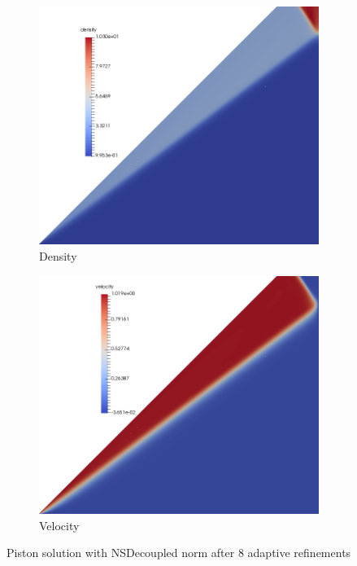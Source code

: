 \documentclass[Dissertation.tex]{subfiles}
\begin{document}
\begin{figure}[ht]
\centering
\begin{subfigure}[t]{0.7\textwidth}
\centering
\includegraphics[width=\textwidth]{Piston/Piston_density.png}
\caption{Density}
\end{subfigure}
\begin{subfigure}[t]{0.7\textwidth}
\centering
\includegraphics[width=\textwidth]{Piston/Piston_velocity.png}
\caption{Velocity}
\end{subfigure}
\caption{Piston solution with NSDecoupled norm after 8 adaptive refinements}
\label{fig:PistonSolution}
\end{figure}
\end{document}
